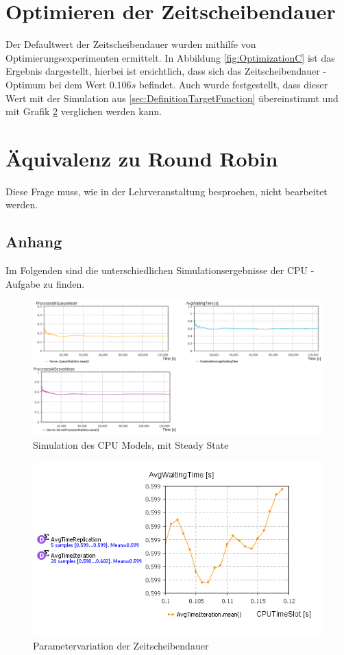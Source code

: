 \documentclass[
a4paper,   
headsepline, 
fleqn,     
11pt
]{scrartcl}
\begin{document}
\section{Optimieren der Zeitscheibendauer}
Der Defaultwert der Zeitscheibendauer wurden mithilfe von Optimierungsexperimenten ermittelt. In Abbildung \ref{fig:OptimizationC} ist das Ergebnis dargestellt, hierbei ist ersichtlich, dass sich das Zeitscheibendauer - Optimum bei dem Wert $0.106s$ befindet. Auch wurde festgestellt, dass dieser Wert mit der Simulation aus \ref{sec:DefinitionTargetFunction} übereinstimmt und mit Grafik \ref{fig:ParametervariationB} verglichen werden kann.

\section{Äquivalenz zu Round Robin}
Diese Frage muss, wie in der Lehrveranstaltung besprochen, nicht bearbeitet werden.

\newpage

\subsection*{Anhang}
Im Folgenden sind die unterschiedlichen Simulationsergebnisse der CPU - Aufgabe zu finden.

\begin{figure}[h]
  \centering
  \includegraphics[width=1\textwidth]{./images/Simulation_SteadyState}
  \caption{Simulation des CPU Models, mit Steady State}
  \label{fig:SimulationA}
\end{figure}

\begin{figure}[h]
  \centering
  \includegraphics[width=1\textwidth]{./images/ParameterVariationCPUTimeSlot}
  \caption{Parametervariation der Zeitscheibendauer}
  \label{fig:ParametervariationB}
\end{figure}
\end{document}

